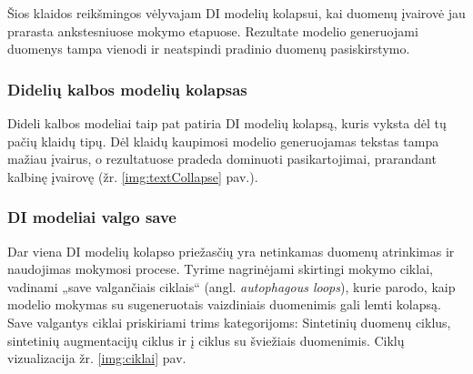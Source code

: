 \documentclass{VUMIFInfKursinis}
\begin{document}
Šios klaidos reikšmingos vėlyvajam DI modelių kolapsui, kai duomenų įvairovė jau prarasta ankstesniuose mokymo etapuose. Rezultate modelio generuojami duomenys tampa vienodi ir neatspindi pradinio duomenų pasiskirstymo.

\subsubsection{Didelių kalbos modelių kolapsas}

Dideli kalbos modeliai taip pat patiria DI modelių kolapsą, kuris vyksta dėl tų pačių klaidų tipų. Dėl klaidų kaupimosi modelio generuojamas tekstas tampa mažiau įvairus, o rezultatuose pradeda dominuoti pasikartojimai, prarandant kalbinę įvairovę (žr. \ref{img:textCollapse} pav.).

\subsubsection{DI modeliai valgo save}
Dar viena DI modelių kolapso priežasčių yra netinkamas duomenų atrinkimas ir naudojimas mokymosi procese. Tyrime \cite{ModelsGoMAD} nagrinėjami skirtingi mokymo ciklai, vadinami „save valgančiais ciklais“ (angl. \textsl{autophagous loops}), kurie parodo, kaip modelio mokymas su sugeneruotais vaizdiniais duomenimis gali lemti kolapsą. Save valgantys ciklai priskiriami trims kategorijoms: Sintetinių duomenų ciklus, sintetinių augmentacijų ciklus ir į ciklus su šviežiais duomenimis. Ciklų vizualizacija žr. \ref{img:ciklai} pav.
\end{document}
